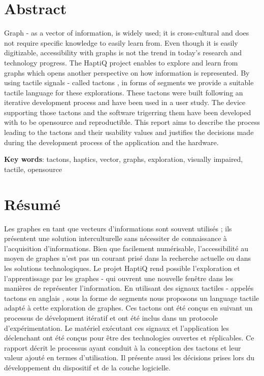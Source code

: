 
\section*{Abstract}
Graph - as a vector of information, is widely used; it is cross-cultural and does not require specific knowledge to easily learn from. Even though it is easily digitizable, accessibility with graphs is not the trend in today's research and technology progress. The HaptiQ project enables to explore and learn from graphs which opens another perspective on how information is represented. By using tactile signals - called tactons \cite{brewster2004tactons}, in forms of segments we provide a suitable tactile language for these explorations. These tactons were built following an iterative development process and have been used in a user study. The device supporting those tactons and the software trigerring them have been developed with to be opensource and reproductible.
This report aims to describe the process leading to the tactons and their usability values and justifies the decisions made during the development process of the application and the hardware.

\noindent\textbf{Key words}: tactons, haptics, vector, graphs, exploration, visually impaired, tactile, opensource

\section*{Résumé}
Les graphes en tant que vecteurs d'informations sont souvent utilisés ; ils présentent une solution interculturelle sans nécessiter de connaissance à l'acquisition d'informations. Bien que facilement numérisable, l'accessibilité au moyen de graphes n'est pas un courant prisé dans la recherche actuelle ou dans les solutions technologiques. Le projet HaptiQ rend possible l'exploration et l'apprentissage par les graphes - qui ouvrent une nouvelle fenêtre dans les manières de représenter l'information. En utilisant des signaux tactiles - appelés tactons en anglais \cite{brewster2004tactons}, sous la forme de segments nous proposons un language tactile adapté à cette exploration de graphes. Ces tactons ont été conçus en suivant un processus de dévelopment itératif et ont été inclus dans un protocole d'expérimentation. Le matériel exécutant ces signaux et l'application les déclenchant ont été conçus pour être des technologies ouvertes et réplicables.
Ce rapport décrit le processus ayant conduit à la conception des tactons et leur valeur ajouté en termes d'utilisation. Il présente aussi les décisions prises lors du développement du dispositif et de la couche logicielle.